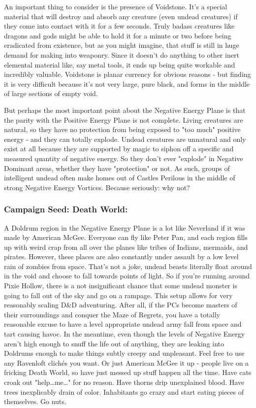 An important thing to consider is the presence of Voidstone. It's a special material that will destroy and absorb any creature (even undead creatures) if they come into contact with it for a few seconds. Truly badass creatures like dragons and gods might be able to hold it for a minute or two before being eradicated from existence, but as you might imagine, that stuff is still in huge demand for making into weaponry. Since it doesn't do anything to other inert elemental material like, say metal tools, it ends up being quite workable and incredibly valuable. Voidstone is planar currency for obvious reasons - but finding it is very difficult because it's not very large, pure black, and forms in the middle of large sections of empty void.

But perhaps the most important point about the Negative Energy Plane is that the parity with the Positive Energy Plane is not complete. Living creatures are natural, so they have no protection from being exposed to "too much" positive energy - and they can totally explode. Undead creatures are unnatural and only exist at all because they are supported by magic to siphon off a specific and measured quantity of negative energy. So they don't ever "explode" in Negative Dominant areas, whether they have "protection" or not. As such, groups of intelligent undead often make homes out of Castles Perilous in the middle of strong Negative Energy Vortices. Because seriously: why not?

\subsubsection{Campaign Seed: Death World:} A Doldrum region in the Negative Energy Plane is a lot like Neverland if it was made by American McGee. Everyone can fly like Peter Pan, and each region fills up with weird crap from all over the planes like tribes of Indians, mermaids, and pirates. However, these places are also constantly under assault by a low level rain of zombies from space. That's not a joke, undead beasts literally float around in the void and choose to fall towards points of light. So if you're running around Pixie Hollow, there is a not insignificant chance that some undead monster is going to fall out of the sky and go on a rampage. This setup allows for very reasonably scaling D\&D adventuring. After all, if the PCs become masters of their surroundings and conquer the Maze of Regrets, you have a totally reasonable excuse to have a level appropriate undead army fall from space and tart causing havoc. In the meantime, even though the levels of Negative Energy aren't high enough to snuff the life out of anything, they are leaking into Doldrums enough to make things subtly creepy and unpleasant. Feel free to use any Ravenloft clichés you want. Or just American McGee it up - people live on a fricking Death World, so have just messed up stuff happen all the time. Have cats croak out "help\ldots me\ldots" for no reason. Have thorns drip unexplained blood. Have trees inexplicably drain of color. Inhabitants go crazy and start eating pieces of themselves. Go nuts.

